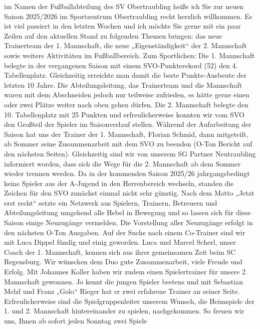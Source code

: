 \vspace{0.5cm}
\normalsize \color{darkgray} 
\begin{doublespace}
	
im Namen der Fu\ss ballabteilung des SV Obertraubling heiße ich Sie zur neuen Saison 2025/2026 im
Sportzentrum Obertraubling recht herzlich willkommen.
Es ist viel passiert in den letzten Wochen und ich möchte Sie gerne mit ein paar Zeilen auf den aktuellen
Stand zu folgenden Themen bringen: das neue Trainerteam der 1. Mannschaft, die neue
„Eigenständigkeit“ der 2. Mannschaft sowie weitere Aktivitäten im Fußballbereich.
Zum Sportlichen:
Die 1. Mannschaft belegte in der vergangenen Saison mit einem SVO-Punkterekord (52) den 4.
Tabellenplatz. Gleichzeitig erreichte man damit die beste Punkte-Ausbeute der letzten 10 Jahre. Die
Abteilungsleitung, das Trainerteam und die Mannschaft waren mit dem Abschneiden jedoch nur
teilweise zufrieden, es hätte gerne einen oder zwei Plätze weiter nach oben gehen dürfen.
Die 2. Mannschaft belegte den 10. Tabellenplatz mit 25 Punkten und erfreulicherweise konnten wir
vom SVO den Großteil der Spieler im Saisonverlauf stellen. Während der Aufarbeitung der Saison hat
uns der Trainer der 1. Mannschaft, Florian Schmid, dann mitgeteilt, ab Sommer seine Zusammenarbeit
mit dem SVO zu beenden (O-Ton Bericht auf den nächsten Seiten).
Gleichzeitig sind wir von unserem SG Partner Neutraubling informiert worden, dass sich die Wege für
die 2. Mannschaft ab dem Sommer wieder trennen werden. Da in der kommenden Saison 2025/26
jahrgangsbedingt keine Spieler aus der A-Jugend in den Herrenbereich wechseln, standen die Zeichen
für den SVO zunächst einmal nicht sehr günstig.
Nach dem Motto „Jetzt erst recht“ setzte ein Netzwerk aus Spielern, Trainern, Betreuern und
Abteilungsleitung umgehend alle Hebel in Bewegung und so lassen sich für diese Saison einige
Neuzugänge vermelden. Die Vorstellung aller Neuzugänge erfolgt in den nächsten O-Ton Ausgaben. Auf der Suche nach einem Co-Trainer sind wir mit Luca Dippel fündig und einig geworden. Luca und
Marcel Scherl, unser Coach der 1. Mannschaft, kennen sich aus ihrer gemeinsamen Zeit beim SC
Regensburg.
Wir wünschen dem Duo gute Zusammenarbeit, viele Freude und Erfolg. Mit Johannes Koller haben wir
zudem einen Spielertrainer für unsere 2. Mannschaft gewonnen.
Jo kennt die jungen Spieler bestens und mit Sebastian Melzl und Franz „Golo“ Rieger hat er zwei
erfahrene Trainer an seiner Seite.
Erfreulicherweise sind die Spielgruppenleiter unserem Wunsch, die Heimspiele der 1. und 2. Mannschaft
hintereinander zu spielen, nachgekommen. So freuen wir uns, Ihnen ab sofort jeden Sonntag zwei Spiele

\end{doublespace}
